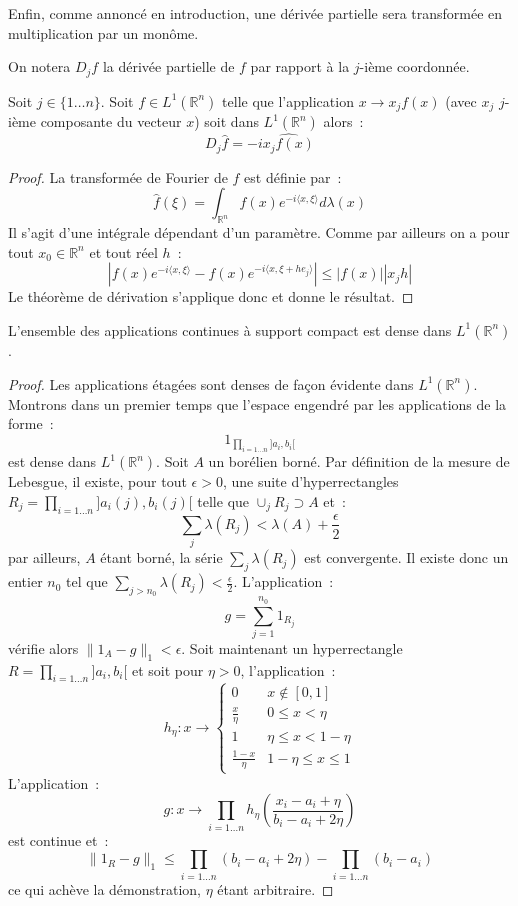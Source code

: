 Enfin, comme annoncé en introduction, une dérivée partielle sera transformée en
multiplication par un monôme.
\begin{term}
On notera $D_jf$  la dérivée partielle de $f$ par rapport à la
$j$-ième coordonnée.
\end{term}
\begin{mandatory}
\begin{prop}
Soit $j \in \{ 1 \dots n \}$.
Soit $f \in L^1(\mathbb{R}^n)$ telle que l'application $x \to x_j
f(x)$ (avec $x_j$ $j$-ième composante du vecteur $x$) soit dans
$L^1(\mathbb{R}^n)$ alors~:
\[
D_j \widehat{f} = - i \widehat{x_j f(x)}
\]
\end{prop}
\end{mandatory}
\begin{proof}
La transformée de Fourier de $f$ est définie par~:
\[
\widehat{f}(\xi) = \int_{\mathbb{R}^n} f(x) e^{- i \langle x, \xi
  \rangle } d \lambda(x)
\]
Il s'agit d'une intégrale dépendant d'un paramètre. Comme par ailleurs
on a pour tout $x_0 \in \mathbb{R}^n$ et tout réel $h$~:
\[
|f(x) e^{-i \langle x, \xi  \rangle } - f(x) e^{-i \langle x, \xi + h
 e_j  \rangle }  |\leq |f(x)||x_j h|
\]
Le théorème de dérivation s'applique donc et donne le résultat.
\end{proof}
\begin{lemme}
L'ensemble des applications continues à support compact est dense dans
$L^1(\mathbb{R}^n)$. 
\end{lemme}
\begin{proof}
Les applications étagées sont denses de façon évidente dans
$L^1(\mathbb{R}^n)$. Montrons dans un premier temps que l'espace
engendré par les applications de la forme~:
\[
1_{\prod_{i=1\dots n} ]a_i, b_i[}
\]
est dense dans $L^1(\mathbb{R}^n)$. Soit $A$ un borélien borné.
Par définition de
la mesure de Lebesgue, il existe, pour tout $\epsilon >0$, une suite 
d'hyperrectangles $R_j = \prod_{i=1\dots n} ]a_i(j), b_i(j)[$ telle que $\cup_j R_j \supset A$ et~:
\[
\sum_j \lambda(R_j) < \lambda(A) + \frac{\epsilon}{2}
\]
par ailleurs, $A$ étant borné, la série $\sum_j \lambda(R_j)$ est
convergente. Il existe donc un entier $n_0$ tel que $\sum_{j > n_0}
\lambda(R_j) < \frac{\epsilon}{2}$. L'application~:
\[
g = \sum_{j=1}^{n_0} 1_{R_j} 
\]
vérifie alors $\| 1_A -g \|_1 < \epsilon$. 
Soit maintenant un hyperrectangle $R = \prod_{i=1\dots n} ]a_i, b_i[$
  et soit pour $\eta > 0$, l'application~:
\[
h_\eta : x \to \left  \{
\begin{array}{ll}
0 & x \notin [0,1] \\
\frac{x}{\eta} & 0 \leq x < \eta \\
1 & \eta \leq x < 1-\eta \\
\frac{1-x}{\eta} & 1-\eta \leq x \leq 1
\end{array}
\right .
\]
L'application~:
\[
g : x \to \prod_{i=1\dots n} h_\eta \left ( \frac{x_i - a_i +\eta}{b_i
  - a_i + 2 \eta} 
\right )
\]
est continue et~:
\[
\| 1_R - g \|_1 \leq \prod_{i=1\dots n} (b_i - a_i + 2 \eta) -
\prod_{i=1\dots n} (b_i - a_i) 
\]  
ce qui achève la démonstration, $\eta$ étant arbitraire.
\end{proof}
